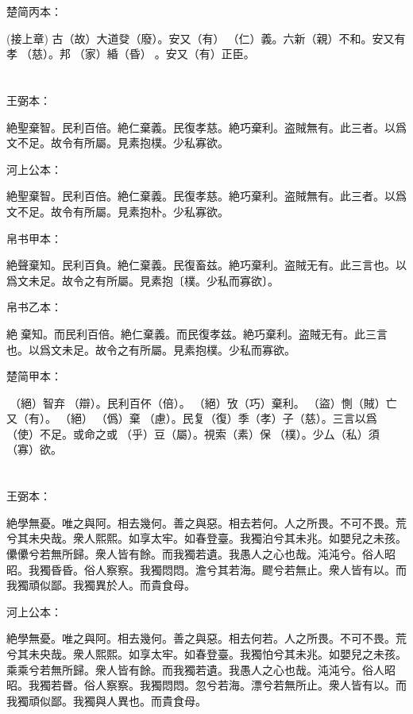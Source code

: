 \documentclass[a5paper]{ctexbook}
\begin{document}
    楚简丙本：

    (接上章) 古（故）大道癹（廢）。安又（有）󶴑（仁）義。六新（親）不和。安又有孝𡥝（慈）。邦𧱌（家）緍（昏）☐。安又（有）正臣。

    \chapter{}
    王弼本：

    絶聖棄智。民利百倍。絶仁棄義。民復孝慈。絶巧棄利。盗賊無有。此三者。以爲文不足。故令有所屬。見素抱樸。少私寡欲。

    河上公本：

    絶聖棄智。民利百倍。絶仁棄義。民復孝慈。絶巧棄利。盗賊無有。此三者。以爲文不足。故令有所屬。見素抱朴。少私寡欲。

    帛书甲本：

    絶聲棄知。民利百負。絶仁棄義。民復畜兹。絶巧棄利。盗賊无有。此三言也。以爲文未足。故令之有所屬。見素抱〔樸。少私而寡欲〕。

    帛书乙本：

    絶𦔻棄知。而民利百倍。絶仁棄義。而民復孝兹。絶巧棄利。盗賊无有。此三言也。以爲文未足。故令之有所屬。見素抱樸。少私而寡欲。

    楚简甲本：

    󶴌（絕）智弃󶴉（辯）。民利百伓（倍）。󶴌（絕）攷（巧）棄利。󶴊（盜）惻（賊）亡又（有）。󶴌（絕）𢠿（僞）棄󶴍（慮）。民复（復）季（孝）子（慈）。三言以爲󶴎（使）不足。或命之或󶴋（乎）豆（屬）。視索（素）保󶴏（樸）。少厶（私）須（寡）欲。

    \chapter{}
    王弼本：

    絶學無憂。唯之與阿。相去幾何。善之與惡。相去若何。人之所畏。不可不畏。荒兮其未央哉。衆人熙熙。如享太牢。如春登臺。我獨泊兮其未兆。如嬰兒之未孩。儽儽兮若無所歸。衆人皆有餘。而我獨若遺。我愚人之心也哉。沌沌兮。俗人昭昭。我獨昏昏。俗人察察。我獨悶悶。澹兮其若海。飂兮若無止。衆人皆有以。而我獨頑似鄙。我獨異於人。而貴食母。

    河上公本：

    絶學無憂。唯之與阿。相去幾何。善之與惡。相去何若。人之所畏。不可不畏。荒兮其未央哉。衆人熙熙。如享太牢。如春登臺。我獨怕兮其未兆。如嬰兒之未孩。乘乘兮若無所歸。衆人皆有餘。而我獨若遺。我愚人之心也哉。沌沌兮。俗人昭昭。我獨若昬。俗人察察。我獨悶悶。忽兮若海。漂兮若無所止。衆人皆有以。而我獨頑似鄙。我獨與人異也。而貴食母。
\end{document}

